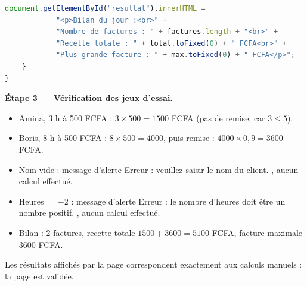 \documentclass[11pt]{article}
\begin{document}
\begin{exoresolu}
\begin{lstlisting}[language=JavaScript]
        document.getElementById("resultat").innerHTML =
            "<p>Bilan du jour :<br>" +
            "Nombre de factures : " + factures.length + "<br>" +
            "Recette totale : " + total.toFixed(0) + " FCFA<br>" +
            "Plus grande facture : " + max.toFixed(0) + " FCFA</p>";
    }
}
\end{lstlisting}

\textbf{Étape 3 — Vérification des jeux d'essai.}
\begin{itemize}
\item Amina, 3 h à 500 FCFA : $3 \times 500 = 1500$ FCFA (pas de remise, car $3 \leq 5$).
\item Boris, 8 h à 500 FCFA : $8 \times 500 = 4000$, puis remise : $4000 \times 0{,}9 = 3600$ FCFA.
\item Nom vide : message d'alerte \og Erreur : veuillez saisir le nom du client. \fg{}, aucun calcul effectué.
\item Heures $= -2$ : message d'alerte \og Erreur : le nombre d'heures doit être un nombre positif. \fg{}, aucun calcul effectué.
\item Bilan : 2 factures, recette totale $1500 + 3600 = 5100$ FCFA, facture maximale 3600 FCFA.
\end{itemize}
Les résultats affichés par la page correspondent exactement aux calculs manuels : la page est validée.
\end{exoresolu}
\end{document}
